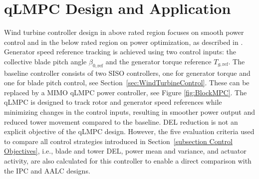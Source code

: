\section{qLMPC Design and Application}\label{sec:quasiLPVMPCDesign}
Wind turbine controller design in above rated region focuses on smooth power control and in the below rated region on power optimization, as described in \cite{Bianchi2007}. Generator speed reference tracking is achieved using two control inputs: the collective blade pitch angle $\beta_{0,\text{ref}}$ and the generator torque reference $T_{g,\text{ref}}$. The baseline controller consists of two SISO controllers, one for generator torque and one for blade pitch control, see Section~\ref{sec:WindTurbineControl}. These can be replaced by a MIMO qLMPC power controller, see Figure \ref{fig:BlockMPC}. The qLMPC is designed to track rotor and generator speed references while minimizing changes in the control inputs, resulting in smoother power output and reduced tower movement compared to the baseline. DEL reduction is not an explicit objective of the qLMPC design. However, the five evaluation criteria used to compare all control strategies introduced in Section~\ref{subsection Control Objectives}, i.e., blade and tower DEL, power mean and variance, and actuator activity, are also calculated for this controller to enable a direct comparison with the IPC and AALC designs.


